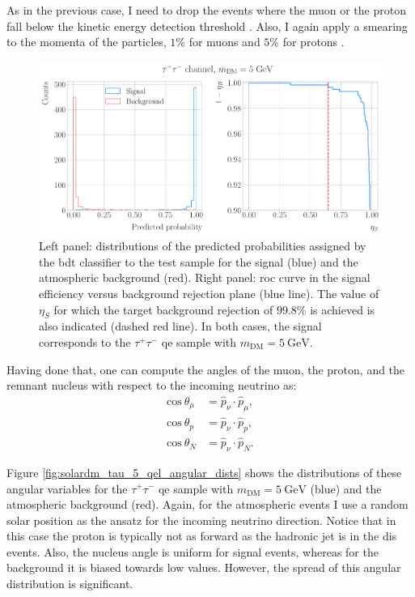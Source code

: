 As in the previous case, I need to drop the events where the muon or the proton fall below the kinetic energy detection threshold \cite{DUNE2020TDR2}. Also, I again apply a smearing to the momenta of the particles, $1\%$ for muons and $5\%$ for protons \cite{DUNE2020TDR2}.

\begin{figure}[t]
	\centering
	\includegraphics[width=0.95\linewidth]{Images/DM_Analysis/solardm_tau_5_qel_bdt_classifier.pdf}
	\caption[Performance of the \gls{bdt} classifier for the $\tau^{+}\tau^{-}$ \gls{qe} signal with $m_{\mathrm{DM}} = 5 \ \mathrm{GeV}$.]{Left panel: distributions of the predicted probabilities assigned by the \gls{bdt} classifier to the test sample for the signal (blue) and the atmospheric background (red). Right panel: \gls{roc} curve in the signal efficiency versus background rejection plane (blue line). The value of $\eta_{S}$ for which the target background rejection of $99.8\%$ is achieved is also indicated (dashed red line). In both cases, the signal corresponds to the $\tau^{+}\tau^{-}$ \gls{qe} sample with $m_{\mathrm{DM}} = 5 \ \mathrm{GeV}$.}
	\label{fig:solardm_tau_5_qel_classifier}
\end{figure}

Having done that, one can compute the angles of the muon, the proton, and the remnant nucleus with respect to the incoming neutrino as:
\begin{align}
	\mathrm{cos} \ \theta_{\mu} &= \hat{p}_{\nu} \cdot \hat{p}_{\mu},\label{6.8} \\
	\mathrm{cos} \ \theta_{p} &= \hat{p}_{\nu} \cdot \hat{p}_{p},\label{6.9} \\
	\mathrm{cos} \ \theta_{N} &= \hat{p}_{\nu} \cdot \hat{p}_{N}. \label{6.10}
\end{align}

Figure \ref{fig:solardm_tau_5_qel_angular_dists} shows the distributions of these angular variables for the $\tau^{+}\tau^{-}$ \gls{qe} sample with $m_{\mathrm{DM}} = 5 \ \mathrm{GeV}$ (blue) and the atmospheric background (red). Again, for the atmospheric events I use a random solar position as the ansatz for the incoming neutrino direction. Notice that in this case the proton is typically not as forward as the hadronic jet is in the \gls{dis} events. Also, the nucleus angle is uniform for signal events, whereas for the background it is biased towards low values. However, the spread of this angular distribution is significant.

